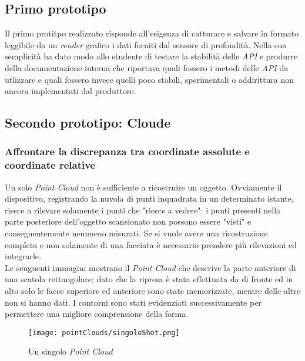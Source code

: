 \subsection{Primo prototipo}
Il primo protitpo realizzato risponde all'esigenza di catturare e salvare in formato leggibile da un \emph{render} grafico i dati forniti dal sensore di profondità.
Nella sua semplicità ha dato modo allo studente di testare la stabilità delle \emph{API} e produrre della documentazione interna che riportava quali fossero i metodi delle \emph{API} da utlizzare e quali fossero invece quelli poco stabili, sperimentali o addirittura non ancora implementati dal produttore.

\subsection{Secondo prototipo: Cloude}
\subsubsection{Affrontare la discrepanza tra coordinate assolute e coordinate relative}
Un solo \emph{Point Cloud} non è sufficiente a ricostruire un oggetto. Ovviamente il dispositivo, registrando la nuvola di punti inquadrata in un determinato istante, riesce a rilevare solamente i punti che "riesce a vedere": i punti presenti nella parte posteriore dell'oggetto scansionato non possono essere "visti" e conseguentemente nemmeno misurati. Se si vuole avere una ricostruzione completa e non solamente di una facciata è necessario prendere più rilevazioni ed integrarle.\\
Le seuguenti immagini mostrano il \emph{Point Cloud} che descrive la parte anteriore di una scatola rettangolare; dato che la ripresa è stata effettuata da di fronte ed in alto solo le facce superiore ed anteriore sono state memorizzate, mentre delle altre non si hanno dati. I contorni sono stati evidenziati successivamente per permettere una migliore comprensione della forma.
\begin{figure}[!h] 
    \centering 
    \texttt{[image: pointClouds/singoloShot.png]} 
    \caption{Un singolo \emph{Point Cloud}}
\end{figure}
